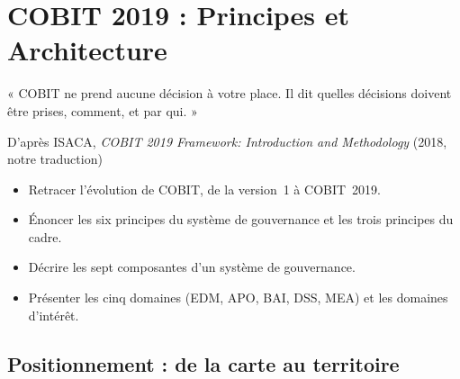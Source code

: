 
\chapter{COBIT 2019 : Principes et Architecture}
\label{chap:cobit-archi}

\epigraph{%
    « COBIT ne prend aucune décision à votre place. Il dit quelles
    décisions doivent être prises, comment, et par qui. »%
}{D'après ISACA, \textit{COBIT 2019 Framework: Introduction and
Methodology} (2018, notre traduction)}


\begin{boxobjectifs}
\begin{itemize}
    \item Retracer l'évolution de COBIT, de la version~1 à COBIT~2019.
    \item Énoncer les six principes du système de gouvernance et les trois
          principes du cadre.
    \item Décrire les sept composantes d'un système de gouvernance.
    \item Présenter les cinq domaines (EDM, APO, BAI, DSS, MEA) et les
          domaines d'intérêt.
\end{itemize}
\end{boxobjectifs}

\bigskip

\section*{Positionnement : de la carte au territoire}

